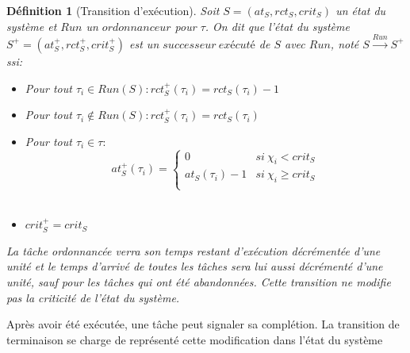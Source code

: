 \documentclass[12pt,a4paper,oneside]{book}
\theoremstyle{break}
\newtheorem{defin}{Définition}[chapter]
\theoremstyle{breakplain}
\begin{document}
\begin{defin}[Transition d'exécution]
Soit $S = (at_S, rct_S, crit_S)$ un état du système et $Run$ un $ordonnanceur$ pour $\tau$. On dit que l'état du système $S^+ = (at_S^+, rct_S^+, crit_S^+)$ est un $successeur\ exécuté$ de $S$ avec $Run$, noté $S\xrightarrow{Run}S^+$ ssi:
\begin{itemize}
\item Pour tout $\tau_i \in Run(S) : rct_S^+(\tau_i) = rct_S(\tau_i)-1$\\
\item Pour tout $\tau_i \not \in Run(S) : rct_S^+(\tau_i) = rct_S(\tau_i)$\\
\item Pour tout $\tau_i \in \tau :$
$$ at_S^+(\tau_i) = \left\{
    \begin{array}{ll}
        0 & si\ \chi_i < crit_S \\
        at_S(\tau_i)-1 & si\ \chi_i \geq crit_S \\
    \end{array}
\right.
$$\\
\item $crit_{S}^{+} = crit_{S}$

\end{itemize}
La tâche ordonnancée verra son temps restant d'exécution décrémentée d'une unité et le temps d'arrivé de toutes les tâches sera lui aussi décrémenté d'une unité, sauf pour les tâches qui ont été abandonnées. Cette transition ne modifie pas la criticité de l'état du système.
\end{defin}

Après avoir été exécutée, une tâche peut signaler sa complétion. La transition de terminaison se charge de représenté cette modification dans l'état du système
\end{document}
